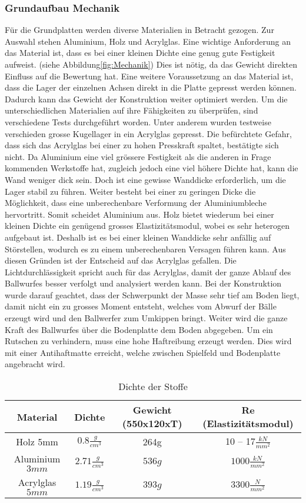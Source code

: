 \subsubsection{Grundaufbau Mechanik}
Für die Grundplatten werden diverse Materialien in Betracht gezogen. Zur Auswahl stehen Aluminium,
Holz und Acrylglas. Eine wichtige Anforderung an das Material ist, dass es bei einer kleinen Dichte
eine genug gute Festigkeit aufweist. (siehe Abbildung\ref{fig:Mechanik}) Dies ist nötig, da das
Gewicht direkten Einfluss auf die Bewertung hat. Eine weitere Voraussetzung an das Material ist,
dass die Lager der einzelnen Achsen direkt in die Platte gepresst werden können. Dadurch kann das
Gewicht der Konstruktion weiter optimiert werden. Um die unterschiedlichen Materialien auf ihre
Fähigkeiten zu überprüfen, sind verschiedene Tests durchgeführt worden. Unter anderem wurden
testweise verschieden grosse Kugellager in ein Acrylglas gepresst. Die befürchtete Gefahr, dass sich
das Acrylglas bei einer zu hohen Presskraft spaltet, bestätigte sich nicht. Da Aluminium eine viel
grössere Festigkeit als die anderen in Frage kommenden Werkstoffe hat, zugleich jedoch eine viel
höhere Dichte hat, kann die Wand weniger dick sein. Doch ist eine gewisse Wanddicke erforderlich,
um die Lager stabil zu führen. Weiter besteht bei einer zu geringen Dicke die Möglichkeit, dass eine
unberechenbare Verformung der Aluminiumbleche hervortritt. Somit scheidet Aluminium aus. Holz bietet
wiederum bei einer kleinen Dichte ein genügend grosses Elastizitätsmodul, wobei es sehr heterogen
aufgebaut ist. Deshalb ist es bei einer kleinen Wanddicke sehr anfällig auf Störstellen, wodurch es
zu einem unberechenbaren Versagen führen kann. Aus diesen Gründen ist der Entscheid auf das
Acrylglas gefallen. Die Lichtdurchlässigkeit spricht auch für das Acrylglas, damit der ganze Ablauf
des Ballwurfes besser verfolgt und analysiert werden kann. Bei der Konstruktion wurde darauf geachtet, dass der Schwerpunkt der Masse sehr tief am Boden liegt, damit nicht ein zu grosses Moment
entsteht, welches vom Abwurf der Bälle erzeugt wird und den Ballwerfer zum Umkippen bringt. Weiter
wird die ganze Kraft des Ballwurfes über die Bodenplatte dem Boden abgegeben. Um ein Rutschen zu
verhindern, muss eine hohe Haftreibung erzeugt werden. Dies wird mit einer Antihaftmatte erreicht,
welche zwischen Spielfeld und Bodenplatte angebracht wird.
\begin{table}[h!]
	\begin{tabular}{cccc}
		Material & Dichte & Gewicht (550x120xT) & Re (Elastizitätsmodul) \\ 
		\hline Holz 5mm & $0.8 \frac{g}{cm^3}$ & 264g & 10 – 17$\frac{kN}{mm^2}$ \\ 
		Aluminium $3 mm$ & $2.71 \frac{g}{cm^3}$ & $536 g$ & $1000 \frac{kN}{mm^2}$ \\ 
		Acrylglas $5 mm$ & $1.19 \frac{g}{cm^3}$ & $393 g$ & $3300 \frac{N}{mm^2}$  \\ 
	\end{tabular} 
		\centering
	\caption[Dichte der Stoffe]{Dichte der Stoffe \cite{beruf:Chemie}}
\end{table}
 		
 			

